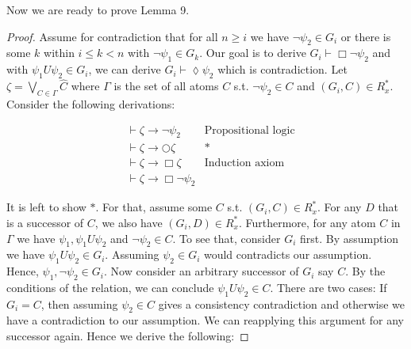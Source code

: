 \documentclass[11pt]{article}
\theoremstyle{definition}
\theoremstyle{remark}
\begin{document}
 Now we are ready to prove Lemma 9. 
 \begin{proof}
    Assume for contradiction that for all $n \geq i$ we have $\neg \psi_2 \in G_i$ or there is some $k$ within $i \leq k < n$ with $\neg \psi_1 \in G_k$.
    Our goal is to derive $G_i \vdash \Box \neg \psi_2$ and with $\psi_1 U \psi_2 \in G_i$, we can derive $G_i \vdash \lozenge \psi_2$ which is contradiction. \newline
    Let $\zeta = \bigvee_{C \in \Gamma} \hat{C}$ where $\Gamma$ is the set of all atoms $C$ s.t. $\neg \psi_2 \in C$ and $(G_i,C) \in R^*_x$. Consider the following derivations:

    \[
        \begin{array}{rll}
            & \vdash \zeta \rightarrow \neg \psi_2 
            &\text{Propositional logic} \\
            & \vdash \zeta \rightarrow \bigcirc \zeta 
            &\text{*} \\
            & \vdash \zeta \rightarrow \Box \zeta 
            &\text{Induction axiom} \\
            &\vdash \zeta \rightarrow \Box \neg \psi_2
        \end{array}
    \]

    It is left to show $*$. For that, assume some $C$ s.t. $(G_i,C) \in R^*_x$. For any $D$
    that is a successor of $C$, we also have $(G_i,D) \in R^*_x$. Furthermore, for any atom $C $ in $\Gamma$ we have $\psi_1, \psi_1 U \psi_2 $ and $\neg \psi_2 \in C$.
    To see that, consider $G_i$ first. By assumption we have $\psi_1 U \psi_2 \in G_i$. Assuming $\psi_2 \in G_i$ would contradicts our assumption. 
    Hence, $\psi_1, \neg \psi_2 \in G_i$. Now consider an arbitrary successor of $G_i$ say $C$. By the conditions of the relation, we can conclude $\psi_1 U \psi_2 \in C$.
    There are two cases: If $G_i = C$, then assuming $\psi_2 \in C$ gives a consistency contradiction and otherwise we have a contradiction to our assumption. We can reapplying this argument for any successor again.
    Hence we derive the following: 


\end{proof}
\end{document}
